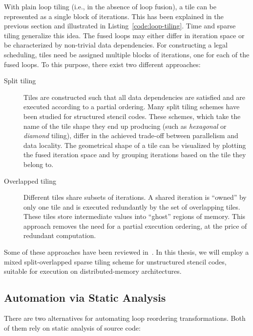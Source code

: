 With plain loop tiling (i.e., in the absence of loop fusion), a tile can be represented as a single block of iterations. This has been explained in the previous section and illustrated in Listing~\ref{code:loop-tiling}. Time and sparse tiling generalize this idea. The fused loops may either differ in iteration space or be characterized by non-trivial data dependencies. For constructing a legal scheduling, tiles need be assigned multiple blocks of iterations, one for each of the fused loops. To this purpose, there exist two different approaches:
\begin{description}
\item[Split tiling] Tiles are constructed such that all data dependencies are satisfied and are executed according to a partial ordering. Many split tiling schemes have been studied for structured stencil codes. These schemes, which take the name of the tile shape they end up producing (such as {\em hexagonal} or {\em diamond} tiling), differ in the achieved trade-off between parallelism and data locality. The geometrical shape of a tile can be visualized by plotting the fused iteration space and by grouping iterations based on the tile they belong to.
\item[Overlapped tiling] Different tiles share subsets of iterations. A shared iteration is ``owned'' by only one tile and is executed redundantly by the set of overlapping tiles. These tiles store intermediate values into ``ghost'' regions of memory. This approach removes the need for a partial execution ordering, at the price of redundant computation.
\end{description}
Some of these approaches have been reviewed in~\cite{survey-tile-shape}. In this thesis, we will employ a mixed split-overlapped sparse tiling scheme for unstructured stencil codes, suitable for execution on distributed-memory architectures.


\subsection{Automation via Static Analysis}
\label{sec:bkg:poly}
There are two alternatives for automating loop reordering transformations. Both of them rely on static analysis of source code:

